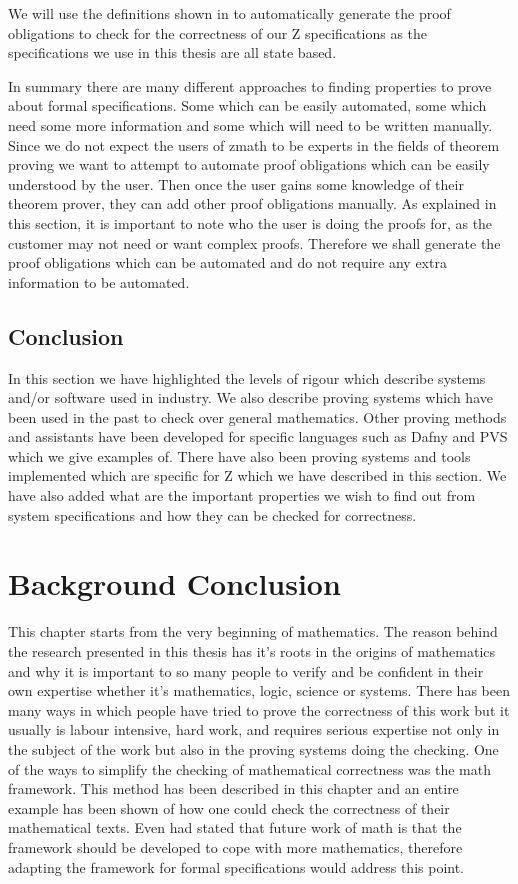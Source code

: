 We will use the definitions shown in \cite{DBLP:conf/icsea/WenMZ06} to
automatically generate the proof obligations to check for the correctness of our
Z specifications as the specifications we use in this thesis are all state
based.

In summary there are many different approaches to finding properties to prove
about formal specifications. Some which can be easily automated, some which need
some more information and some which will need to be written manually. Since we
do not expect the users of \gls{zmath} to be experts in the fields of theorem
proving we want to attempt to automate proof obligations which can be easily
understood by the user. Then once the user gains some knowledge of their theorem
prover, they can add other proof obligations manually. As explained in this
section, it is important to note who the user is doing the proofs for, as the
customer may not need or want complex proofs. Therefore we shall generate the
proof obligations which can be automated and do not require any extra
information to be automated.


\subsection{Conclusion}

In this section we have highlighted the levels of rigour which describe systems
and/or software used in industry. We also describe proving systems which have
been used in the past to check over general mathematics. Other proving methods
and assistants have been developed for specific languages such as Dafny and PVS
which we give examples of. There have also been proving systems and tools
implemented which are specific for Z which we have described in this section. We
have also added what are the important properties we wish to find out from
system specifications and how they can be checked for correctness.

\section{Background Conclusion}

This chapter starts from the very beginning of mathematics. The reason behind
the research presented in this thesis has it's roots in the origins of
mathematics and why it is important to so many people to verify and be confident
in their own expertise whether it's mathematics, logic, science or systems.
There has been many ways in which people have tried to prove the correctness of
this work but it usually is labour intensive, hard work, and requires serious
expertise not only in the subject of the work but also in the proving systems
doing the checking. One of the ways to simplify the checking of mathematical
correctness was the \gls{math} framework. This method has been described in this
chapter and an entire example has been shown of how one could check the
correctness of their mathematical texts. Even \cite{lamarphd} had stated
that future work of \gls{math} is that the framework should be developed to cope
with more mathematics, therefore adapting the framework for formal
specifications would address this point.

